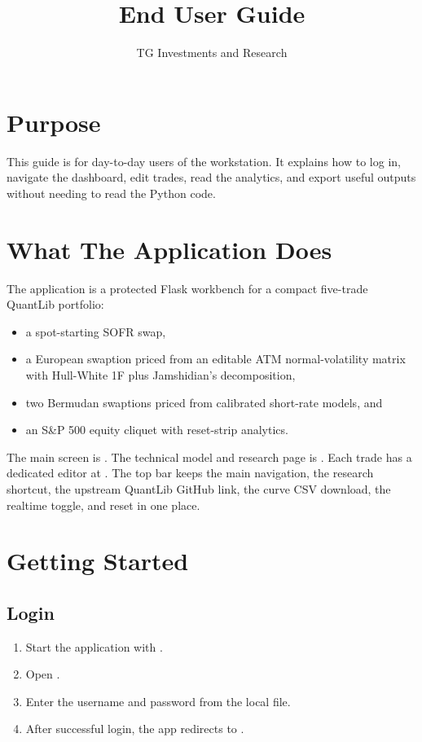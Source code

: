 \documentclass[11pt]{article}
\title{End User Guide\\\large \product}
\author{TG Investments and Research}
\date{\docdate}
\begin{document}
\maketitle
\tableofcontents
\newpage

\section{Purpose}
This guide is for day-to-day users of the workstation. It explains how to log in, navigate the dashboard, edit trades, read the analytics, and export useful outputs without needing to read the Python code.

\section{What The Application Does}
The application is a protected Flask workbench for a compact five-trade QuantLib portfolio:
\begin{itemize}[leftmargin=1.5em]
    \item a spot-starting SOFR swap,
    \item a European swaption priced from an editable ATM normal-volatility matrix with Hull-White 1F plus Jamshidian's decomposition,
    \item two Bermudan swaptions priced from calibrated short-rate models, and
    \item an S\&P 500 equity cliquet with reset-strip analytics.
\end{itemize}

The main screen is . The technical model and research page is . Each trade has a dedicated editor at . The top bar keeps the main navigation, the research shortcut, the upstream QuantLib GitHub link, the curve CSV download, the realtime toggle, and reset in one place.

\section{Getting Started}
\subsection{Login}
\begin{enumerate}[leftmargin=1.5em]
    \item Start the application with .
    \item Open .
    \item Enter the username and password from the local  file.
    \item After successful login, the app redirects to .
\end{enumerate}
\end{document}
